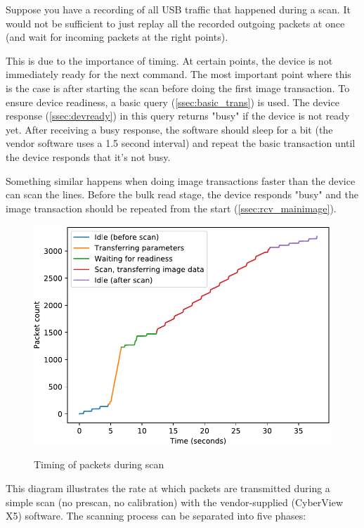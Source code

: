 \documentclass{article}
\begin{document}
Suppose you have a recording of all USB traffic that happened during a scan.
It would not be sufficient to just replay all the recorded outgoing packets
at once (and wait for incoming packets at the right points).

This is due to the importance of timing. At certain points, the device
is not immediately ready for the next command. The most important point
where this is the case is after starting the scan before doing the first
image transaction. To ensure device readiness, a basic query (\autoref{ssec:basic_trans})
is used. The device response (\autoref{ssec:devready}) in this query returns "busy" if the device
is not ready yet. After receiving a busy response, the software should sleep
for a bit (the vendor software uses a 1.5 second interval) and repeat the basic transaction
until the device responds that it's not busy.

Something similar happens when doing image transactions faster than the device
can scan the lines. Before the bulk read stage, the device responds "busy"
and the image transaction should be repeated from the start (\autoref{ssec:rcv_mainimage}).

\begin{figure}[H]
  \caption{Timing of packets during scan}
  \centering
  \includegraphics[width=\textwidth]{images/time_diagram.pdf}
  \label{time_diagram}
\end{figure}

This diagram illustrates the rate at which packets are transmitted
during a simple scan (no prescan, no calibration) with the vendor-supplied
(CyberView X5) software.
The scanning process can be separated into five phases:
\end{document}
